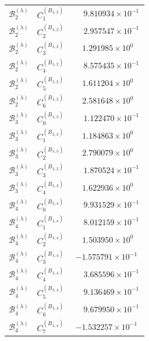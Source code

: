 \begin{table}[htbp]
\begin{tabular}{|c|c|c|}
		\(\mathcal B_2^{(\lambda)}\) & \(C_1^{(B_{\lambda,2})}\) & \(\phantom{-}9.810934\times10^{-1}\) \\
		\(\mathcal B_2^{(\lambda)}\) & \(C_2^{(B_{\lambda,2})}\) & \(\phantom{-}2.957547\times10^{-1}\) \\
		\(\mathcal B_2^{(\lambda)}\) & \(C_3^{(B_{\lambda,2})}\) & \(\phantom{-}1.291985\times10^{0\phantom{-}}\) \\
		\(\mathcal B_2^{(\lambda)}\) & \(C_4^{(B_{\lambda,2})}\) & \(\phantom{-}8.575435\times10^{-1}\) \\
		\(\mathcal B_2^{(\lambda)}\) & \(C_5^{(B_{\lambda,2})}\) & \(\phantom{-}1.611204\times10^{0\phantom{-}}\) \\
		\(\mathcal B_2^{(\lambda)}\) & \(C_6^{(B_{\lambda,2})}\) & \(\phantom{-}2.581648\times10^{0\phantom{-}}\) \\
		\hline
		\(\mathcal B_3^{(\lambda)}\) & \(C_0^{(B_{\lambda,3})}\) & \(\phantom{-}1.122470\times10^{-1}\) \\
		\(\mathcal B_3^{(\lambda)}\) & \(C_1^{(B_{\lambda,3})}\) & \(\phantom{-}1.184863\times10^{0\phantom{-}}\) \\
		\(\mathcal B_3^{(\lambda)}\) & \(C_2^{(B_{\lambda,3})}\) & \(\phantom{-}2.790079\times10^{0\phantom{-}}\) \\
		\(\mathcal B_3^{(\lambda)}\) & \(C_3^{(B_{\lambda,3})}\) & \(\phantom{-}1.870524\times10^{-1}\) \\
		\(\mathcal B_3^{(\lambda)}\) & \(C_4^{(B_{\lambda,3})}\) & \(\phantom{-}1.622936\times10^{0\phantom{-}}\) \\
		\hline
		\(\mathcal B_4^{(\lambda)}\) & \(C_0^{(B_{\lambda,4})}\) & \(\phantom{-}9.931529\times10^{-1}\) \\
		\(\mathcal B_4^{(\lambda)}\) & \(C_1^{(B_{\lambda,4})}\) & \(\phantom{-}8.012159\times10^{-1}\) \\
		\(\mathcal B_4^{(\lambda)}\) & \(C_2^{(B_{\lambda,4})}\) & \(\phantom{-}1.503950\times10^{0\phantom{-}}\) \\
		\(\mathcal B_4^{(\lambda)}\) & \(C_3^{(B_{\lambda,4})}\) & \(-1.575791\times10^{-1}\) \\
		\(\mathcal B_4^{(\lambda)}\) & \(C_4^{(B_{\lambda,4})}\) & \(\phantom{-}3.685596\times10^{-1}\) \\
		\(\mathcal B_4^{(\lambda)}\) & \(C_5^{(B_{\lambda,4})}\) & \(\phantom{-}9.136469\times10^{-1}\) \\
		\(\mathcal B_4^{(\lambda)}\) & \(C_6^{(B_{\lambda,4})}\) & \(\phantom{-}9.679950\times10^{-1}\) \\
		\(\mathcal B_4^{(\lambda)}\) & \(C_7^{(B_{\lambda,4})}\) & \(-1.532257\times10^{-1}\) \\
		\hline
	\end{tabular}
\end{table}
